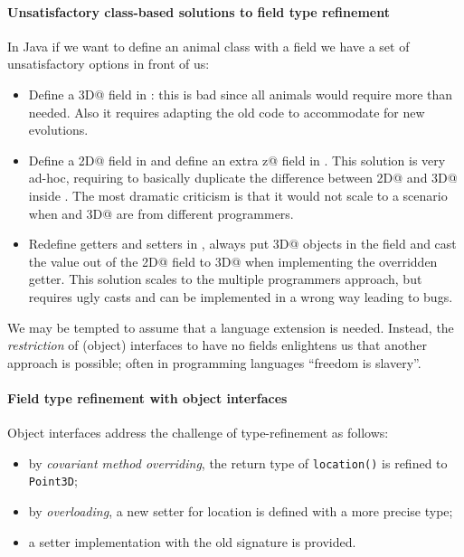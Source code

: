 \paragraph{Unsatisfactory class-based solutions to field type refinement}
In Java if we want to define an animal class with a field we have a set of
unsatisfactory options in front of us:
\begin{itemize}
\item Define a \Q@Point3D@ field in \Q@Animal@: this is bad since all animals
  would require more than needed.
  Also it requires adapting the old code to accommodate for new evolutions.

\item Define a \Q@Point2D@ field in \Q@Animal@ and define an extra \Q@int z@
  field in \Q@Bird@.  This solution is very ad-hoc, requiring to basically
  duplicate the difference between \Q@Point2D@ and \Q@Point3D@ inside \Q@Bird@.
  The most dramatic criticism is that it would not scale to a scenario when
  \Q@Bird@ and \Q@Point3D@ are from different programmers.

\item Redefine getters and setters in \Q@Bird@, always put \Q@Point3D@ objects
  in the field and cast the value out of the \Q@Point2D@ field to \Q@Point3D@
  when implementing the overridden getter.  This solution scales to the multiple
  programmers approach, but requires ugly casts and can be implemented in a
  wrong way leading to bugs.
\end{itemize}

We may be tempted to assume that a language extension is needed.
Instead, the \emph{restriction} of (object) interfaces to have no
fields enlightens us that another approach is possible; often in programming languages ``freedom is slavery''.

\paragraph{Field type refinement with object interfaces}
Object interfaces address the challenge of type-refinement as follows:
\begin{itemize}
\item by \emph{covariant method overriding}, the return type of
  \texttt{location()} is refined to \texttt{Point3D};
\item by \emph{overloading}, a new setter for location is defined with a more
  precise type;
\item a \Q@default@ setter implementation with the old signature is provided.
\end{itemize}

